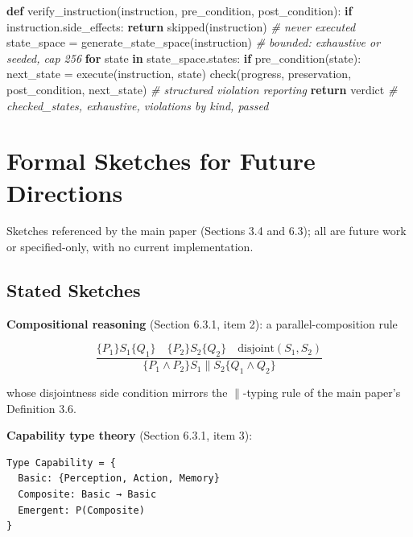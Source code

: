 \documentclass[
  11pt,
]{article}
\newenvironment{Shaded}{}{}
\newcommand{\CommentTok}[1]{\textcolor[rgb]{0.38,0.63,0.69}{\textit{#1}}}
\newcommand{\ControlFlowTok}[1]{\textcolor[rgb]{0.00,0.44,0.13}{\textbf{#1}}}
\newcommand{\KeywordTok}[1]{\textcolor[rgb]{0.00,0.44,0.13}{\textbf{#1}}}
\newcommand{\NormalTok}[1]{#1}
\newcommand{\OperatorTok}[1]{\textcolor[rgb]{0.40,0.40,0.40}{#1}}
\begin{document}
\begin{Shaded}
\begin{Highlighting}[]
\KeywordTok{def}\NormalTok{ verify\_instruction(instruction, pre\_condition, post\_condition):}
    \ControlFlowTok{if}\NormalTok{ instruction.side\_effects: }\ControlFlowTok{return}\NormalTok{ skipped(instruction)  }\CommentTok{\# never executed}
\NormalTok{    state\_space }\OperatorTok{=}\NormalTok{ generate\_state\_space(instruction)  }\CommentTok{\# bounded: exhaustive or seeded, cap 256}
    \ControlFlowTok{for}\NormalTok{ state }\KeywordTok{in}\NormalTok{ state\_space.states:}
        \ControlFlowTok{if}\NormalTok{ pre\_condition(state):}
\NormalTok{            next\_state }\OperatorTok{=}\NormalTok{ execute(instruction, state)}
\NormalTok{            check(progress, preservation, post\_condition, next\_state)  }\CommentTok{\# structured violation reporting}
    \ControlFlowTok{return}\NormalTok{ verdict  }\CommentTok{\# checked\_states, exhaustive, violations by kind, passed}
\end{Highlighting}
\end{Shaded}

\section{Formal Sketches for Future
Directions}\label{formal-sketches-for-future-directions}

Sketches referenced by the main paper (Sections 3.4 and 6.3); all are
future work or specified-only, with no current implementation.

\subsection{Stated Sketches}\label{stated-sketches}

\textbf{Compositional reasoning} (Section 6.3.1, item 2): a
parallel-composition rule

\[
\frac{\{P_1\}S_1\{Q_1\} \quad \{P_2\}S_2\{Q_2\} \quad \text{disjoint}(S_1, S_2)}{\{P_1 \land P_2\}S_1 \parallel S_2\{Q_1 \land Q_2\}}
\]

whose disjointness side condition mirrors the \(\parallel\)-typing rule
of the main paper's Definition 3.6.

\textbf{Capability type theory} (Section 6.3.1, item 3):

\begin{verbatim}
Type Capability = {
  Basic: {Perception, Action, Memory}
  Composite: Basic → Basic
  Emergent: P(Composite)
}
\end{verbatim}
\end{document}
